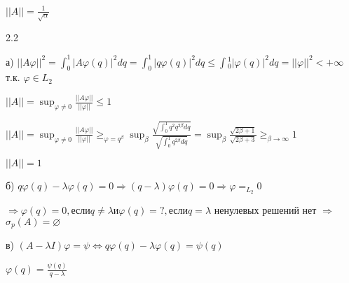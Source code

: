 \documentclass[russian]{article}
\begin{document}
$ ||A|| = \frac{1}{\sqrt{\alpha}} $

2.2

а) $ ||A\varphi||^2=\int_0^1|A\varphi(q)|^2dq=\int_{0}^{1}|q\varphi(q)|^2dq \le \int{}_{0}^{1}|\varphi (q)|^2dq =|| \varphi ||^2<+\infty$ т.к. $\varphi \in L_2 $

$ ||A|| = \sup _{\varphi \ne 0 } \frac{||A\varphi||}{||\varphi||} \le 1 $ 

$ ||A|| = \sup _{\varphi \ne 0 } \frac{||A\varphi||}{||\varphi||} \ge _{\varphi=q^\beta} \sup_\beta \frac{\sqrt{\int_0^1q^2q^{2\beta}dq}}{\sqrt{\int_0^1q^{2\beta}dq}} = \sup _\beta \frac{\sqrt{2\beta + 1}}{\sqrt{2\beta+3}} \ge _{\beta \rightarrow \infty} 1$

$ ||A|| = 1 $

б) $q\varphi(q)-\lambda\varphi(q)=0\Rightarrow(q-\lambda)\varphi(q)=0\Rightarrow\varphi=_{L_{2}}0$

$\Rightarrow \varphi(q) =
	0, \mbox{если} q \ne \lambda \mbox{и} \varphi(q) =
	?, \mbox{если} q = \lambda
$ ненулевых решений нет $\Rightarrow$ $\sigma_{p}(A)=\varnothing$

в) $(A-\lambda I)\varphi=\psi\Leftrightarrow q\varphi(q)-\lambda\varphi(q)=\psi(q)$

$\varphi(q)=\frac{\psi(q)}{q-\lambda}$
\end{document}
